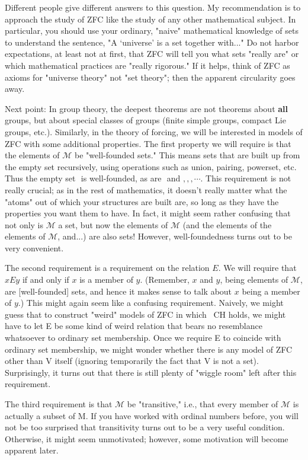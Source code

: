 \documentclass[10pt]{article}
\theoremstyle{definition}
\begin{document}
Different people give different answers to this question.  My recommendation
is to approach the study of ZFC like the study of any other mathematical
subject.  In particular, you should use your ordinary, "naive" mathematical
knowledge of sets to understand the sentence, "A `universe' is a set
together with..."  Do not harbor expectations, at least not at first, that
ZFC will tell you what sets "really are" or which mathematical practices are
"really rigorous."  If it helps, think of ZFC as axioms for "universe
theory" not "set theory"; then the apparent circularity goes away.

Next point: In group theory, the deepest theorems are not theorems about
\textbf{all} groups, but about special classes of groups (finite simple groups,
compact Lie groups, etc.).  Similarly, in the theory of forcing, we will be
interested in models of ZFC with some additional properties.  The first
property we will require is that the elements of $\mathcal{M}$ be "well-founded sets."
This means sets that are built up from the empty set recursively, using
operations such as union, pairing, powerset, etc.  Thus the empty set ${}$ is
well-founded, as are ${{}}$ and ${{}, {{}}, {{{}}}, \cdots}$.  This requirement is
not really crucial; as in the rest of mathematics, it doesn't really matter
what the "atoms" out of which your structures are built are, so long as they
have the properties you want them to have.  In fact, it might seem rather
confusing that not only is $\mathcal{M}$ a set, but now the elements of $\mathcal{M}$ (and the
elements of the elements of $\mathcal M$, and...) are also sets!  However,
well-foundedness turns out to be very convenient.

The second requirement is a requirement on the relation $E$.  We will require
that $x E y$ if and only if $x$ is a member of $y$.  (Remember, $x$ and $y$, being
elements of $\mathcal M$, are [well-founded] sets, and hence it makes sense to talk
about $x$ being a member of $y$.)  This might again seem like a confusing
requirement.  Naively, we might guess that to construct "weird" models of
ZFC in which ~CH holds, we might have to let E be some kind of weird
relation that bears no resemblance whatsoever to ordinary set membership.
Once we require E to coincide with ordinary set membership, we might wonder
whether there is any model of ZFC other than V itself (ignoring temporarily
the fact that V is not a set).  Surprisingly, it turns out that there is
still plenty of "wiggle room" left after this requirement.

The third requirement is that $\mathcal{M}$ be "transitive," i.e., that every member of
$\mathcal M$ is actually a subset of M.  If you have worked with ordinal numbers
before, you will not be too surprised that transitivity turns out to be a
very useful condition.  Otherwise, it might seem unmotivated; however, some
motivation will become apparent later.
\end{document}
